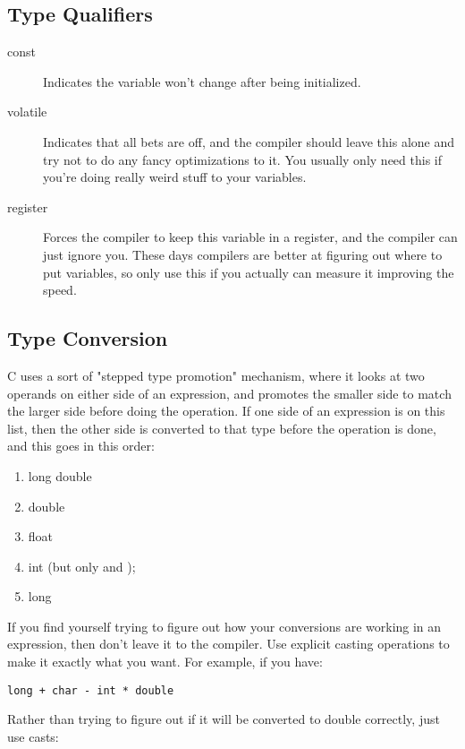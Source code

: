 \subsection{Type Qualifiers}

\begin{description}
\item[const] Indicates the variable won't change after being initialized.
\item[volatile] Indicates that all bets are off, and the compiler should leave
    this alone and try not to do any fancy optimizations to it.  You usually
    only need this if you're doing really weird stuff to your variables.
\item[register] Forces the compiler to keep this variable in a register, and
    the compiler can just ignore you.  These days compilers are better at 
    figuring out where to put variables, so only use this if you actually
    can measure it improving the speed.
\end{description}


\subsection{Type Conversion}

C uses a sort of "stepped type promotion" mechanism, where it looks at two operands on
either side of an expression, and promotes the smaller side to match the larger side
before doing the operation.  If one side of an expression is on this list, then the 
other side is converted to that type before the operation is done, and this goes
in this order:

\begin{enumerate}
\item long double
\item double 
\item float
\item int (but only  and );
\item long
\end{enumerate}

If you find yourself trying to figure out how your conversions are working in
an expression, then don't leave it to the compiler.  Use explicit casting
operations to make it exactly what you want.  For example, if you have:

\verb|long + char - int * double|

Rather than trying to figure out if it will be converted to double correctly,
just use casts:

